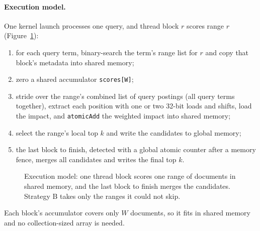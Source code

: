 \documentclass[11pt]{article}
\begin{document}
\paragraph{Execution model.} One kernel launch processes one query, and thread block $r$ scores range $r$
(Figure~\ref{fig:model}):
\begin{enumerate}
\item for each query term, binary-search the term's range list for $r$ and copy that block's metadata
  into shared memory;
\item zero a shared accumulator \texttt{scores[W]};
\item stride over the range's combined list of query postings (all query terms together), extract each
  position with one or two 32-bit loads and shifts, load the impact, and \texttt{atomicAdd} the
  weighted impact into shared memory;
\item select the range's local top $k$ and write the candidates to global memory;
\item the last block to finish, detected with a global atomic counter after a memory fence, merges all
  candidates and writes the final top $k$.
\end{enumerate}
\begin{figure}[H]\centering
{}
\caption{Execution model: one thread block scores one range of documents in shared memory, and the last block to finish merges the candidates. Strategy B takes only the ranges it could not skip.}
\label{fig:model}
\end{figure}
Each block's accumulator covers only $W$ documents, so it fits in shared memory and no
collection-sized array is needed.
\end{document}
